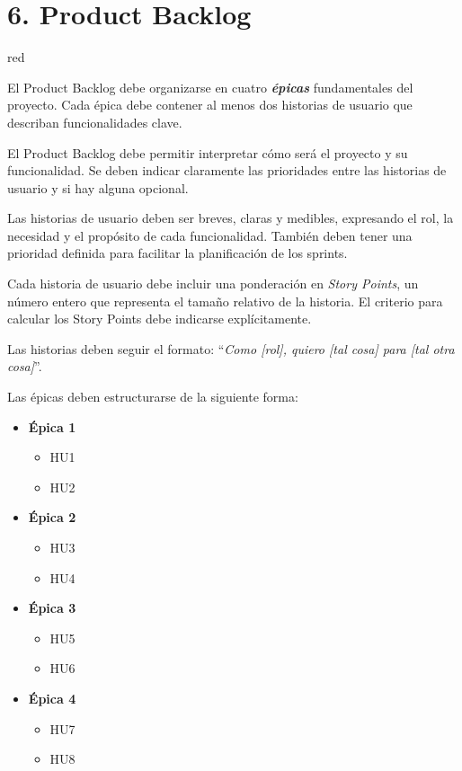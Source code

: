\documentclass[
11pt, %
]{charter}
\begin{document}
\section{6. Product Backlog}
\label{sec:backlog}

\begin{consigna}{red} %

El Product Backlog debe organizarse en cuatro \textbf{\textit{\'{e}picas}} fundamentales del proyecto. Cada \'{e}pica debe contener al menos dos historias de usuario que describan funcionalidades clave.

El Product Backlog debe permitir interpretar cómo será el proyecto y su funcionalidad. Se deben indicar claramente las prioridades entre las historias de usuario y si hay alguna opcional.

Las historias de usuario deben ser breves, claras y medibles, expresando el rol, la necesidad y el propósito de cada funcionalidad. También deben tener una prioridad definida para facilitar la planificación de los sprints.

Cada historia de usuario debe incluir una ponderación en \textit{Story Points}, un número entero que representa el tama\~no relativo de la historia. El criterio para calcular los Story Points debe indicarse explícitamente.

Las historias deben seguir el formato: ``\textit{Como [rol], quiero [tal cosa] para [tal otra cosa]}''.

Las \'{e}picas deben estructurarse de la siguiente forma:

\begin{itemize}
  \item \textbf{\'{E}pica 1}
    \begin{itemize}
      \item HU1
      \item HU2
    \end{itemize}
  \item \textbf{\'{E}pica 2}
    \begin{itemize}
      \item HU3
      \item HU4
    \end{itemize}
  \item \textbf{\'{E}pica 3}
    \begin{itemize}
      \item HU5
      \item HU6
    \end{itemize}
  \item \textbf{\'{E}pica 4}
    \begin{itemize}
      \item HU7
      \item HU8
    \end{itemize}
\end{itemize}


\end{consigna}
\end{document}
